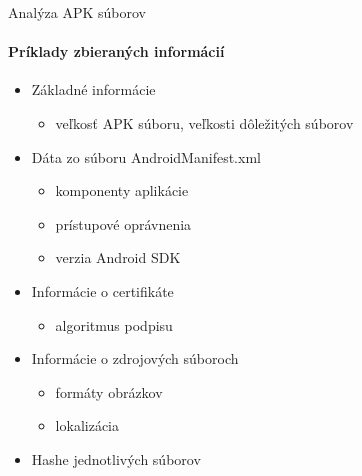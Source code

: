 \documentclass{beamer}
\begin{document}
   
   \begin{frame}[label=lists]{Analýza APK súborov}
  		\framesubtitle{Príklady zbieraných informácií}
	 \begin{itemize}
			\item Základné informácie
			\begin{itemize}
				\item veľkosť APK súboru, veľkosti dôležitých súborov
			\end{itemize}
			\item Dáta zo súboru AndroidManifest.xml
			\begin{itemize}
				\item komponenty aplikácie
				\item prístupové oprávnenia
				\item verzia Android SDK
			\end{itemize}
			\item Informácie o certifikáte
			\begin{itemize}
				\item algoritmus podpisu
			\end{itemize}
			\item Informácie o zdrojových súboroch
			\begin{itemize}
				\item formáty obrázkov
				\item lokalizácia
			\end{itemize}
			\item Hashe jednotlivých súborov
		\end{itemize}	    
   \end{frame} 
\end{document}

